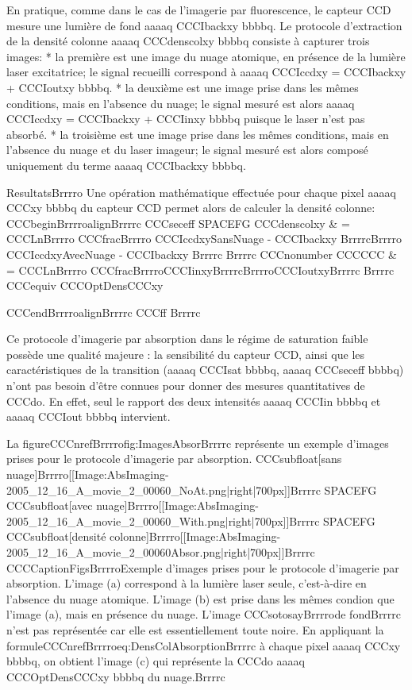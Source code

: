 En pratique, comme dans le cas de l'imagerie par fluorescence, le capteur CCD mesure une lumière de fond aaaaq CCCIbackxy bbbbq. Le protocole d'extraction de la densité colonne aaaaq CCCdenscolxy bbbbq consiste à capturer trois images:
	* la première est une image du nuage atomique, en présence de la lumière laser excitatrice; le signal recueilli correspond à aaaaq CCCIccdxy = CCCIbackxy + CCCIoutxy bbbbq.
	* la deuxième est une image prise dans les mêmes conditions, mais en l'absence du nuage; le signal mesuré est alors aaaaq CCCIccdxy = CCCIbackxy + CCCIinxy bbbbq puisque le laser n'est pas absorbé.
	* la troisième est une image prise dans les mêmes conditions, mais en l'absence du nuage et du laser imageur; le signal mesuré est alors composé uniquement du terme aaaaq CCCIbackxy bbbbq.





ResultatsBrrrro
Une opération mathématique effectuée pour chaque pixel aaaaq CCCxy bbbbq du capteur CCD permet alors de calculer la densité colonne:
CCCbeginBrrrroalignBrrrrc
	CCCseceff  SPACEFG  CCCdenscolxy 
	& = 
	CCCLnBrrrro
	CCCfracBrrrro
	CCCIccdxySansNuage - CCCIbackxy
	BrrrrcBrrrro
	CCCIccdxyAvecNuage - CCCIbackxy
	Brrrrc
	Brrrrc CCCnonumber CCCCCC
	& = 
	CCCLnBrrrro
	CCCfracBrrrroCCCIinxyBrrrrcBrrrroCCCIoutxyBrrrrc
	Brrrrc
	CCCequiv CCCOptDensCCCxy
	
CCCendBrrrroalignBrrrrc
CCCff
Brrrrc



Ce protocole d'imagerie par absorption dans le régime de saturation faible possède une qualité majeure : la sensibilité du capteur CCD, ainsi que les caractéristiques de la transition (aaaaq CCCIsat bbbbq, aaaaq CCCseceff bbbbq) n'ont pas besoin d'être connues pour donner des mesures quantitatives de CCCdo. En effet, seul le rapport des deux intensités aaaaq CCCIin bbbbq et aaaaq CCCIout bbbbq intervient. 



La figureCCCnrefBrrrrofig:ImagesAbsorBrrrrc représente un exemple d'images prises pour le protocole d'imagerie par absorption.
CCCsubfloat[sans nuage]Brrrro[[Image:AbsImaging-2005_12_16_A_movie_2_00060_NoAt.png|right|700px]]Brrrrc SPACEFG 
CCCsubfloat[avec nuage]Brrrro[[Image:AbsImaging-2005_12_16_A_movie_2_00060_With.png|right|700px]]Brrrrc SPACEFG 
CCCsubfloat[densité colonne]Brrrro[[Image:AbsImaging-2005_12_16_A_movie_2_00060Absor.png|right|700px]]Brrrrc
CCCCaptionFigsBrrrroExemple d'images prises pour le protocole d'imagerie par absorption. L'image (a) correspond à la lumière laser seule, c'est-à-dire en l'absence du nuage atomique. L'image (b) est prise dans les mêmes condion que l'image (a), mais en présence du nuage. L'image CCCsotosayBrrrrode fondBrrrrc n'est pas représentée car elle est essentiellement toute noire. En appliquant la formuleCCCnrefBrrrroeq:DensColAbsorptionBrrrrc à chaque pixel aaaaq CCCxy bbbbq, on obtient l'image (c) qui représente la CCCdo aaaaq CCCOptDensCCCxy bbbbq du nuage.Brrrrc



